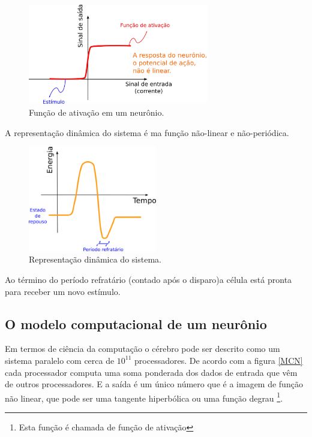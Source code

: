 \begin{figure}[H]
	\centering
	\includegraphics[width=0.7\textwidth]{Imagens/Fig6.png}
	\caption{Função de ativação em um neurônio.}
\end{figure} 

A representação dinâmica do sistema é ma função não-linear e não-periódica.


\begin{figure}[H]
	\centering
	\includegraphics[width=0.5\textwidth]{Imagens/Fig7.png}
	\caption{Representação dinâmica do sistema.}
\end{figure} 

Ao término do período refratário (contado após o disparo)a célula está pronta para receber um novo estímulo.


\subsection{O modelo computacional de um neurônio}

Em termos de ciência da computação o cérebro pode ser descrito como um sistema paralelo com cerca de $10^{11}$ processadores. De acordo com a figura \ref{MCN} cada processador computa uma soma ponderada dos dados de entrada que vêm de outros processadores. E a saída é um único número que é a imagem de função não linear, que pode ser uma tangente hiperbólica ou uma função degrau \footnote{Esta função é chamada de função de ativação}. 

